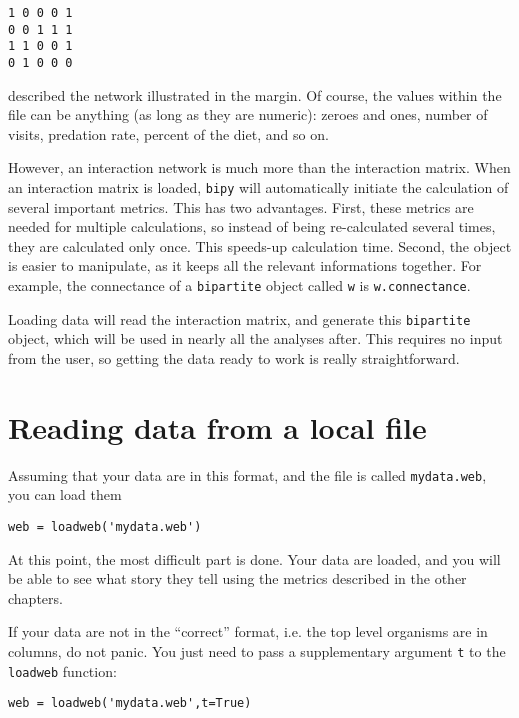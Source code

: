 \documentclass[10pt]{scrbook}
\begin{document}
\begin{verbatim}
1 0 0 0 1
0 0 1 1 1
1 1 0 0 1
0 1 0 0 0
\end{verbatim}

\noindent described the network illustrated in the margin. Of course, the values within the file can be anything (as long as they are numeric): zeroes and ones, number of visits, predation rate, percent of the diet, and so on.

However, an interaction network is much more than the interaction matrix. When an interaction matrix is loaded, \texttt{bipy} will automatically initiate the calculation of several important metrics. This has two advantages. First, these metrics are needed for multiple calculations, so instead of being re-calculated several times, they are calculated only once. This speeds-up calculation time. Second, the object is easier to manipulate, as it keeps all the relevant informations together. For example, the connectance of a \texttt{bipartite} object called \texttt{w} is \texttt{w.connectance}.

Loading data will read the interaction matrix, and generate this \texttt{bipartite} object, which will be used in nearly all the analyses after. This requires no input from the user, so getting the data ready to work is really straightforward.

\section{Reading data from a local file}

Assuming that your data are in this format, and the file is called \texttt{mydata.web}, you can load them

\begin{lstlisting}[caption=loading data from a file]
web = loadweb('mydata.web')
\end{lstlisting}

At this point, the most difficult part is done. Your data are loaded, and you will be able to see what story they tell using the metrics described in the other chapters.

If your data are not in the ``correct'' format, i.e. the top level organisms are in columns, do not panic. You just need to pass a supplementary argument \texttt{t} to the \texttt{loadweb} function:

\begin{lstlisting}[caption=loading data from a file and transposing the data]
web = loadweb('mydata.web',t=True)
\end{lstlisting}
\end{document}
